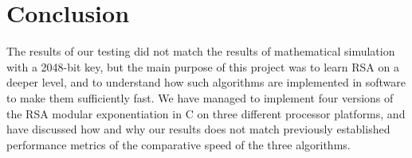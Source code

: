 \documentclass[twocolumn]{IEEEtran}
\begin{document}
\section{Conclusion}
The results of our testing did not match the results of mathematical simulation with a 2048-bit key, but the main purpose of this project was to learn RSA on a deeper level, and to understand how such algorithms are implemented in software to make them sufficiently fast.  We have managed to implement four versions of the RSA modular exponentiation in C on three different processor platforms, and have discussed how and why our results does not match previously established performance metrics of the comparative speed of the three algorithms.



\end{document}
